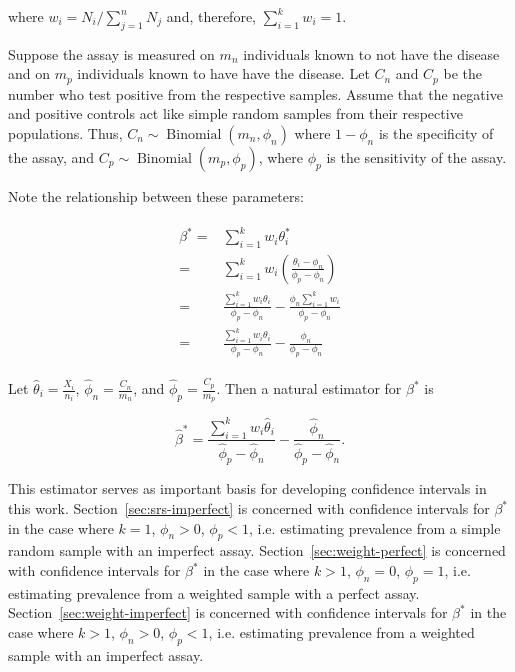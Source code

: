 \documentclass[AMA,STIX1COL]{WileyNJD-v2}
\begin{document}
where \( w_i = N_i / \sum_{j=1}^n N_j \) and, therefore, \( \sum_{i=1}^k w_i = 1 \).

Suppose the assay is measured on \( m_n \) individuals known to not have the disease and on \( m_p \) individuals known to have have the disease.
Let \( C_n \) and \( C_p \) be the number who test positive from the respective samples.
Assume that the negative and positive controls act like simple random samples from their respective populations.
Thus, \( C_n \sim \operatorname{Binomial}(m_n, \phi_n) \) where \( 1 - \phi_n \) is the specificity of the assay, and \( C_p \sim \operatorname{Binomial}(m_p, \phi_p) \), where  \( \phi_p \) is the sensitivity of the assay.

Note the relationship between these parameters:

\begin{align}
\begin{split}
  \beta^*   =&   \sum_{i=1}^k w_i \theta_i^* \\
            =&  \sum_{i=1}^k w_i \left( \frac{\theta_i - \phi_n}{\phi_p - \phi_n} \right) \\
            =&   \frac{\sum_{i=1}^k w_i \theta_i}{\phi_p - \phi_n} - \frac{\phi_n \sum_{i=1}^k w_i}{\phi_p - \phi_n} \\
            =&   \frac{\sum_{i=1}^k w_i \theta_i}{\phi_p - \phi_n} - \frac{\phi_n}{\phi_p - \phi_n}
            \label{eq:long-beta}
\end{split}
\end{align}

Let \( \hat{\theta}_i = \frac{X_i}{n_i} \), \( \hat{\phi}_n = \frac{C_n}{m_n} \), and \( \hat{\phi}_p = \frac{C_p}{m_p} \).
Then a natural estimator for \( \beta^* \) is 

\begin{equation}
    \hat{\beta}^* = \frac{\sum_{i=1}^k w_i \hat{\theta}_i}{\hat{\phi}_p - \hat{\phi}_n} - \frac{\hat{\phi}_n}{\hat{\phi}_p - \hat{\phi}_n}.
\end{equation}

This estimator serves as important basis for developing confidence intervals in this work.
Section~\ref{sec:srs-imperfect} is concerned with confidence intervals for  \( \beta^* \) in the case where \( k = 1 \), \( \phi_n > 0 \), \( \phi_p < 1 \), i.e. estimating prevalence from a simple random sample with an imperfect assay.
Section~\ref{sec:weight-perfect} is concerned with confidence intervals for  \( \beta^* \) in the case where \( k > 1 \), \( \phi_n = 0 \), \( \phi_p = 1 \), i.e. estimating prevalence from a weighted sample with a perfect assay.
Section~\ref{sec:weight-imperfect} is concerned with confidence intervals for  \( \beta^* \) in the case where \( k > 1 \), \( \phi_n > 0 \), \( \phi_p < 1 \), i.e. estimating prevalence from a weighted sample with an imperfect assay.
\end{document}
